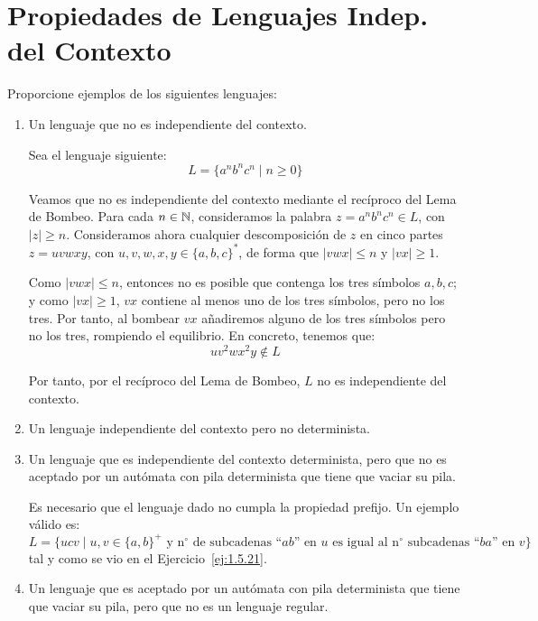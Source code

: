\newpage
\section{Propiedades de Lenguajes Indep. del Contexto}

\begin{ejercicio}\label{ej:1.6.1}
    Proporcione ejemplos de los siguientes lenguajes:
    \begin{enumerate}
        \item Un lenguaje que no es independiente del contexto.
        
        Sea el lenguaje siguiente:
        \begin{equation*}
            L = \{a^n b^n c^n \mid n\geq 0\}
        \end{equation*}

        Veamos que no es independiente del contexto mediante el recíproco del Lema de Bombeo. Para cada $n\in \mathbb{N}$, consideramos la palabra $z=a^n b^n c^n\in L$, con $|z|\geq n$. Consideramos ahora cualquier descomposición de $z$ en cinco partes $z=uvwxy$, con $u,v,w,x,y\in {\{a,b,c\}}^{\ast}$, de forma que $|vwx|\leq n$ y $|vx|\geq 1$.

        Como $|vwx|\leq n$, entonces no es posible que contenga los tres símbolos $a,b,c$;
        y como $|vx|\geq 1$, $vx$ contiene al menos uno de los tres símbolos, pero no los tres.
        Por tanto, al bombear $vx$ añadiremos alguno de los tres símbolos pero no los tres, rompiendo el equilibrio. En concreto, tenemos que:
        \begin{equation*}
            uv^2wx^2y \notin L
        \end{equation*}

        Por tanto, por el recíproco del Lema de Bombeo, $L$ no es independiente del contexto.
        \item Un lenguaje independiente del contexto pero no determinista.
        \item Un lenguaje que es independiente del contexto determinista, pero que no es aceptado por un autómata con pila determinista que tiene que vaciar su pila.
        
        Es necesario que el lenguaje dado no cumpla la propiedad prefijo. Un ejemplo válido es:
        \begin{equation*}
            L = \{ucv\mid u,v\in {\{a,b\}}^{+} \text{\ y n$^\circ$ de subcadenas ``}ab \text{'' en\ } u \text{\ es igual al n$^\circ$ subcadenas ``} ba \text{'' en\ }v\}
        \end{equation*}
        tal y como se vio en el Ejercicio~\ref{ej:1.5.21}.
        \item Un lenguaje que es aceptado por un autómata con pila determinista que tiene que vaciar su pila, pero que no es un lenguaje regular.
        
    \end{enumerate}
\end{ejercicio}

